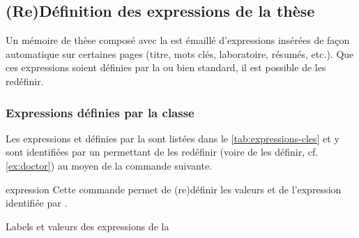 \subsection{(Re)Définition des expressions de la thèse}\label{sec:expressions-cles}

Un mémoire de thèse composé avec la \yatcl est émaillé d'expressions insérées
de façon automatique sur certaines pages (titre, mots clés, laboratoire,
résumés, etc.). Que ces expressions soient définies par la \yatcl ou bien
standard, il est possible de les redéfinir.

\subsubsection{Expressions définies par la classe}
\label{sec:expr-defin-par}

Les expressions  et  définies par la \yatcl
sont listées dans le \vref{tab:expressions-cles} et y sont identifiées par un
 permettant de les redéfinir (voire de les définir, cf.
\vref{ex:doctor}) au moyen de la commande  suivante.
%
\begin{docCommand}{expression}{}
  Cette commande permet de (re)définir les valeurs  et
   de l'expression identifiée par .
\end{docCommand}

\begin{table}
  \centering
  
  \caption{Labels et valeurs des expressions de la \yatcl}
  \label{tab:expressions-cles}
\end{table}

